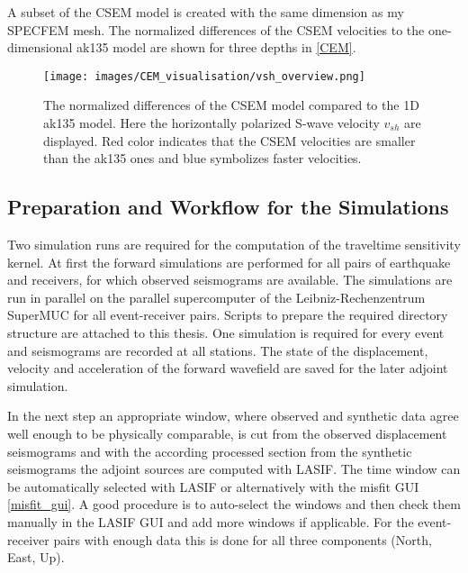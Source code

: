 A subset of the CSEM model is created with the same dimension as my SPECFEM mesh. 
The normalized differences of the CSEM velocities to the one-dimensional ak135 model \citep{Kennett1995} are shown for three
depths in \autoref{CEM}.

\begin{figure}[h]
\begin{center}
\texttt{[image: images/CEM\_visualisation/vsh\_overview.png]}
\caption{The normalized differences of the CSEM model \citep{Afanasiev2014} compared to the 1D ak135 model. 
Here the horizontally polarized S-wave velocity $v_{sh}$ are displayed. Red color indicates that the CSEM
velocities are smaller than the ak135 ones and blue symbolizes faster velocities.}  
\label{CEM}
\end{center}
\end{figure}


\subsection{Preparation and Workflow for the Simulations}



Two simulation runs are required for the computation of the traveltime sensitivity kernel.
%
At first the forward simulations are performed for all pairs of earthquake and receivers, for which observed seismograms are available.
The simulations are run in parallel on the parallel supercomputer of the Leibniz-Rechenzentrum SuperMUC for all event-receiver pairs. 
Scripts to prepare the required directory structure are attached to this thesis. %
One simulation is required for every event and seismograms are recorded at all stations. 
The state of the displacement, velocity and acceleration of the forward wavefield are saved for the later adjoint simulation.

In the next step an appropriate window, where observed and synthetic data agree well enough to be physically comparable,
is cut from the observed displacement seismograms and with the according processed section from the synthetic seismograms 
the adjoint sources are computed with LASIF.
The time window can be automatically selected with LASIF or alternatively with the misfit GUI \autoref{misfit_gui}.
%
A good procedure is to auto-select the windows and then check them manually in the LASIF GUI and 
add more windows if applicable.
For the event-receiver pairs with enough data this is done for all three components (North, East, Up).


